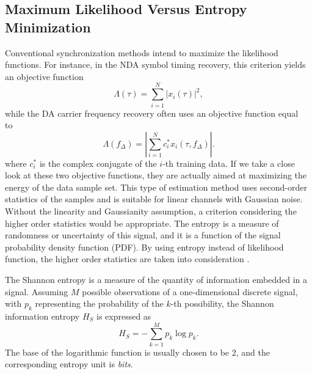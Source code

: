 \documentclass[journal,comsoc]{IEEEtran}
\begin{document}
\subsection{Maximum Likelihood Versus Entropy Minimization}
Conventional synchronization methods intend to maximize the likelihood functions.
For instance, in the NDA symbol timing recovery, this criterion yields an objective function~\cite{mengali1997synchronization}
\begin{equation}
\Lambda(\tau) =\sum\limits_{i = 1}^N {{{\left| {{x_i}( \tau )} \right|}^2}}, 
\end{equation}
while the DA carrier frequency recovery often uses an objective function equal to~\cite{mengali1997synchronization}
\begin{equation}
\Lambda ({f_\Delta })=\left| \sum\limits_{i = 1}^N {{{{c_i^*{x_i}(\tau ,{f_\Delta })}}}} \right|. 
\end{equation}
where \(c_i^*\) is the complex conjugate of the \(i\)-th training data.
If we take a close look at these two objective functions, they are actually aimed at maximizing the energy of the data sample set.
This type of estimation method uses second-order statistics of the samples and is suitable for linear channels with Gaussian noise.
Without the linearity and Gaussianity assumption, a criterion considering the higher order statistics would be appropriate.
The entropy is a measure of randomness or uncertainty of this signal, and it is a function of the signal probability density function (PDF).
By using entropy instead of likelihood function, the higher order statistics are taken into consideration \cite{Santamaria2002}.

The Shannon entropy is a measure of the quantity of information  embedded in a signal.
Assuming \(M\) possible observations of a one-dimensional discrete signal, with \(p_k\) representing the probability of the \(k\)-th possibility, the Shannon information entropy \(H_S\) is expressed as \cite{Shannon1948}
\begin{equation}
H_S =  - \sum\limits_{k = 1}^M {{p_k}\log {p_k}}.
\label{eq:entropy}
\end{equation}
The base of the logarithmic function is usually chosen to be 2, and the corresponding entropy unit is \textit{bits}.
\end{document}
